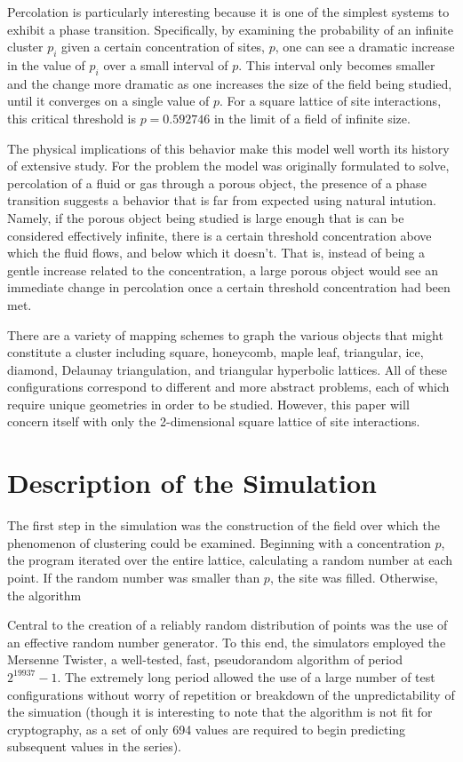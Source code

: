 \documentclass[twocolumn,prb,amsmath,amssymb,amsfonts]{revtex4}
\begin{document}
Percolation is particularly interesting because it is one of the simplest systems to exhibit a phase transition. Specifically, by examining the probability of an infinite cluster $p_i$ given a certain concentration of sites, $p$, one can see a dramatic increase in the value of $p_i$ over a small interval of $p$. This interval only becomes smaller and the change more dramatic as one increases the size of the field being studied, until it converges on a single value of $p$. For a square lattice of site interactions, this critical threshold is $p=0.592746$ in the limit of a field of infinite size.

The physical implications of this behavior make this model well worth its history of extensive study. For the problem the model was originally formulated to solve, percolation of a fluid or gas through a porous object, the presence of a phase transition suggests a behavior that is far from expected using natural intution. Namely, if the porous object being studied is large enough that is can be considered effectively infinite, there is a certain threshold concentration above which the fluid flows, and below which it doesn't. That is, instead of being a gentle increase related to the concentration, a large porous object would see an immediate change in percolation once a certain threshold concentration had been met. 

There are a variety of mapping schemes to graph the various objects that might constitute a cluster including square, honeycomb, maple leaf, triangular, ice, diamond, Delaunay triangulation, and triangular hyperbolic lattices. All of these configurations correspond to different and more abstract problems, each of which require unique geometries in order to be studied. However, this paper will concern itself with only the 2-dimensional square lattice of site interactions. 

\section{Description of the Simulation}
The first step in the simulation was the construction of the field over which the phenomenon of clustering could be examined. Beginning with a concentration $p$, the program iterated over the entire lattice, calculating a random number at each point. If the random number was smaller than $p$, the site was filled. Otherwise, the algorithm 

Central to the creation of a reliably random distribution of points was the use of an effective random number generator. To this end, the simulators employed the Mersenne Twister, a well-tested, fast, pseudorandom algorithm of period $2^{19937}-1$. The extremely long period allowed the use of a large number of test configurations without worry of repetition or breakdown of the unpredictability of the simuation (though it is interesting to note that the algorithm is not fit for cryptography, as a set of only 694 values are required to begin predicting subsequent values in the series).
\end{document}
